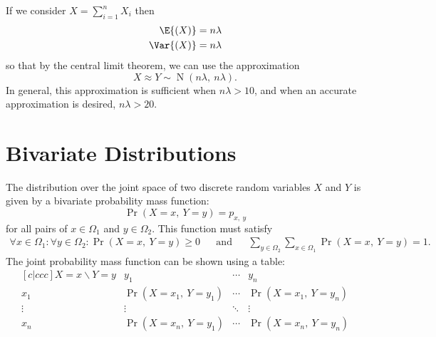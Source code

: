 \documentclass{article}
\begin{document}
If we consider \(X = \sum_{i = 1}^n X_i\) then
\begin{align*}
    \E{\left( X \right)}   & = n \lambda \\
    \Var{\left( X \right)} & = n \lambda
\end{align*}
so that by the central limit theorem, we can use the approximation
\begin{equation*}
    X \approx Y \sim \operatorname{N}{\left( n\lambda,\: n\lambda \right)}.
\end{equation*}
In general, this approximation is sufficient when \(n \lambda > 10\), and when an accurate approximation is desired, \(n \lambda > 20\).
\section{Bivariate Distributions}
\begin{definition}
    The distribution over the joint space of two discrete random variables \(X\) and \(Y\) is given by a bivariate probability mass function:
    \begin{equation*}
        \Pr{\left( X = x,\: Y = y \right)} = p_{x,\: y}
    \end{equation*}
    for all pairs of \(x \in \Omega_1\) and \(y \in \Omega_2\). This function must satisfy
    \begin{align*}
        \forall x \in \Omega_1 : \forall y \in \Omega_2 : \Pr{\left( X = x,\: Y = y \right)} \geq 0 &  & \text{and} &  &
        \sum_{y \in \Omega_2} \sum_{x \in \Omega_1} \Pr{\left( X = x,\: Y = y \right)} = 1.
    \end{align*}
    The joint probability mass function can be shown using a table:
    \begin{equation*}
        \begin{matrix}[c|ccc] %
            X=x \backslash Y=y & y_1                                    & \cdots & y_n                                    \\
            \hline %
            x_1                & \Pr{\left( X = x_1,\: Y = y_1 \right)} & \cdots & \Pr{\left( X = x_1,\: Y = y_n \right)} \\
            \vdots             & \vdots                                 & \ddots & \vdots                                 \\
            x_n                & \Pr{\left( X = x_n,\: Y = y_1 \right)} & \cdots & \Pr{\left( X = x_n,\: Y = y_n \right)}
        \end{matrix}
    \end{equation*}
\end{definition}
\end{document}
